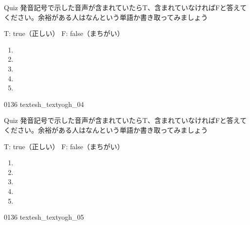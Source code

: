 \documentclass[aspectratio=169, xcolor={dvipsnames,table}]{beamer}
\begin{document}
\begin{frame}[plain]{Quiz }
  \large 発音記号で示した音声が含まれていたらT、含まれていなければFと答えてください。余裕がある人はなんという単語か書き取ってみましょう

  \hfill{}{\scriptsize T: true（正しい）\hspace{5pt} F: false（まちがい）}
  \begin{enumerate}
    \item \mbox{}\hspace{1\zw}

    \item \mbox{}\hspace{1\zw}

    \item \mbox{}\hspace{1\zw}

    \item \mbox{}\hspace{1\zw}

    \item \mbox{}\hspace{1\zw}
  \end{enumerate}

  \hfill{\tiny 0136}\,{\scriptsize {}}\,{\tiny textesh\_textyogh\_04}
\end{frame}
\begin{frame}[plain]{Quiz }
  発音記号で示した音声が含まれていたらT、含まれていなければFと答えてください。余裕がある人はなんという単語か書き取ってみましょう

  \hfill{}{\scriptsize T: true（正しい）\hspace{5pt} F: false（まちがい）}

  \Large
  \begin{enumerate}
    \item \mbox{}\hspace{1\zw}

    \item \mbox{}\hspace{1\zw}

    \item \mbox{}\hspace{1\zw}

    \item \mbox{}\hspace{1\zw}

    \item \mbox{}\hspace{1\zw}
  \end{enumerate}

  \hfill{\tiny 0136}\,{\scriptsize {}}\,{\tiny textesh\_textyogh\_05}
\end{frame}
\end{document}
